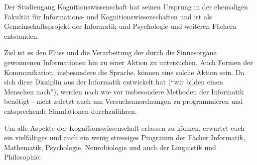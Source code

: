 
Der Studiengang Kognitionswissenschaft hat seinen Ursprung in der ehemaligen
Fakultät für Informations- und Kognitionswissenschaften und ist als
Gemeinschaftsprojekt der Informatik und Psychologie und weiteren Fächern
entstanden.

Ziel ist es den Fluss und die Verarbeitung der durch die Sinnesorgane gewonnenen
Informationen hin zu einer Aktion zu untersuchen. Auch Formen der Kommunikation,
insbesondere die Sprache, können eine solche Aktion sein. Da sich diese
Disziplin aus der Informatik entwickelt hat ("`wir bilden einen Menschen 
nach"'), werden nach wie vor insbesondere Methoden der Informatik benötigt - 
nicht zuletzt auch um Versuchsanordnungen zu programmieren und entsprechende 
Simulationen durchzuführen. 

Um alle Aspekte der Kognitionswissenschaft erfassen zu können, erwartet euch ein
vielfältiges und auch ein wenig stressiges Programm der Fächer Informatik,
Mathematik, Psychologie, Neurobiologie und auch der Linguistik und Philosophie: 

